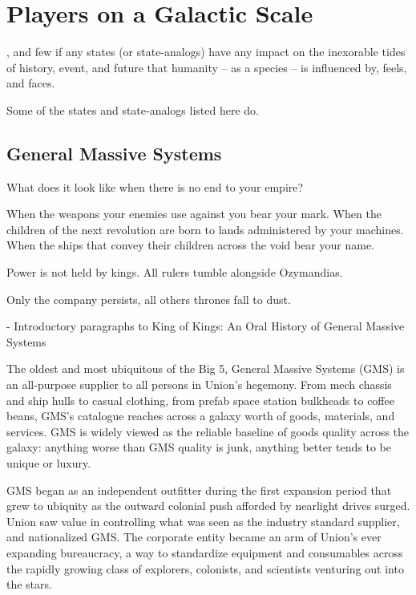 \section{Players on a Galactic Scale}

, and few if any states (or state-analogs) have any
impact on the inexorable tides of history, event, and future that humanity -- as a species -- is
influenced by, feels, and faces.

Some of the states and state-analogs listed here do.

\subsection{General Massive Systems}

\begin{loreQuote}
    What does it look like when there is no end to your empire?

    When the weapons your enemies use against you bear your mark. When the children of
    the next revolution are born to lands administered by your machines. When the ships that
    convey their children across the void bear your name.

    Power is not held by kings. All rulers tumble alongside Ozymandias.

    Only the company persists, all others thrones fall to dust.

    \qquad - \quad Introductory paragraphs to \textnormal{King of Kings: An Oral History of General Massive Systems}
\end{loreQuote}

The oldest and most ubiquitous of the Big 5, General Massive Systems (GMS) is an all-purpose
supplier to all persons in Union's hegemony. From mech chassis and ship hulls to casual clothing,
from prefab space station bulkheads to coffee beans, GMS's catalogue reaches across a galaxy
worth of goods, materials, and services. GMS is widely viewed as the reliable baseline of goods
quality across the galaxy: anything worse than GMS quality is junk, anything better tends to be
unique or luxury.

GMS began as an independent outfitter during the first expansion period that grew to ubiquity as
the outward colonial push afforded by nearlight drives surged. Union saw value in controlling what
was seen as the industry standard supplier, and nationalized GMS. The corporate entity became
an arm of Union's ever expanding bureaucracy, a way to standardize equipment and
consumables across the rapidly growing class of explorers, colonists, and scientists venturing out
into the stars.


